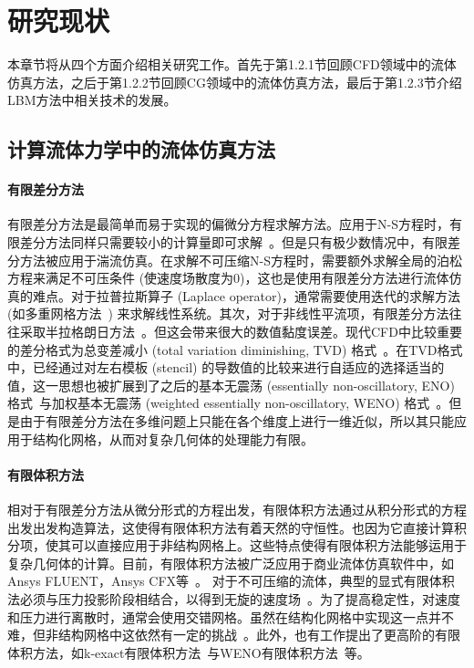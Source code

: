 \section{研究现状}
本章节将从四个方面介绍相关研究工作。首先于第1.2.1节回顾CFD领域中的流体仿真方法，之后于第1.2.2节回顾CG领域中的流体仿真方法，最后于第1.2.3节介绍LBM方法中相关技术的发展。

\subsection{计算流体力学中的流体仿真方法}
\paragraph{有限差分方法}
有限差分方法是最简单而易于实现的偏微分方程求解方法。应用于N-S方程时，有限差分方法同样只需要较小的计算量即可求解~\cite{kooij2018comparison,vreman2014comparison}。但是只有极少数情况中，有限差分方法被应用于湍流仿真。在求解不可压缩N-S方程时，需要额外求解全局的泊松方程来满足不可压条件 (使速度场散度为0)，这也是使用有限差分方法进行流体仿真的难点。对于拉普拉斯算子 (Laplace operator)，通常需要使用迭代的求解方法 (如多重网格方法~\cite{golub2013matrix}) 来求解线性系统。其次，对于非线性平流项，有限差分方法往往采取半拉格朗日方法~\cite{smolarkiewicz1992class}。但这会带来很大的数值黏度误差。现代CFD中比较重要的差分格式为总变差减小 (total variation diminishing, TVD) 格式~\cite{osher1986very, YEE1985327, HARTEN1983357}。在TVD格式中，已经通过对左右模板 (stencil) 的导数值的比较来进行自适应的选择适当的值，这一思想也被扩展到了之后的基本无震荡 (essentially non-oscillatory, ENO) 格式~\cite{HARTEN19973, SHU198932, SHU1988439}与加权基本无震荡 (weighted essentially non-oscillatory, WENO) 格式~\cite{LIU1994200}。但是由于有限差分方法在多维问题上只能在各个维度上进行一维近似，所以其只能应用于结构化网格，从而对复杂几何体的处理能力有限。

\paragraph{有限体积方法}
相对于有限差分方法从微分形式的方程出发，有限体积方法通过从积分形式的方程出发出发构造算法，这使得有限体积方法有着天然的守恒性。也因为它直接计算积分项，使其可以直接应用于非结构网格上。这些特点使得有限体积方法能够运用于复杂几何体的计算。目前，有限体积方法被广泛应用于商业流体仿真软件中，如Ansys FLUENT，Ansys CFX等~\cite{JEONG201419}。 
对于不可压缩的流体，典型的显式有限体积法必须与压力投影阶段相结合，以得到无旋的速度场~\cite{https://doi.org/10.1002/fld.310, pember1996higher}。为了提高稳定性，对速度和压力进行离散时，通常会使用交错网格。虽然在结构化网格中实现这一点并不难，但非结构网格中这依然有一定的挑战~\cite{herbin2012staggered, gao2012unstructured, bermudez1998upwind}。此外，也有工作提出了更高阶的有限体积方法，如k-exact有限体积方法~\cite{barth1990higher}与WENO有限体积方法~\cite{HU199997}等。

